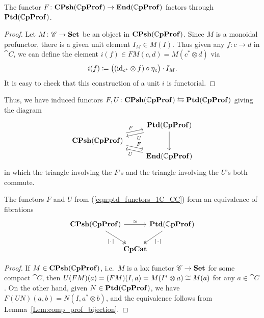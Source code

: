 \documentclass[11pt,oneside,article]{memoir}
\begin{document}
\begin{proposition}
    \label{Prop:canonical unit}
  The functor $F\colon\mathbf{CPsh}(\mathbb{C}\mathbf{pProf})\to\mathbf{End}(\mathbb{C}\mathbf{pProf})$ factors through $\mathbf{Ptd}(\mathbb{C}\mathbf{pProf})$.
\end{proposition}
\begin{proof}
  Let $M\colon \mathscr{C}\to\mathbf{Set}$ be an object in $\mathbf{CPsh}(\mathbb{C}\mathbf{pProf})$. Since $M$ is a monoidal
  profunctor, there is a given unit element $I_M\in M(I)$. Thus given any $f\colon c\to d$ in $
  \cat{C}$, we can define the element $i(f)\in FM(c,d)=M(c^*\otimes d)$ via
  \[
    i(f)\coloneqq\big((\mathrm{id}_{c^*}\otimes f)\circ\eta_c\big)\cdot I_M.
  \]
  It is easy to check that this construction of a unit $i$ is functorial.
\end{proof}

Thus, we have induced functors $F,U\colon\mathbf{CPsh}(\mathbb{C}\mathbf{pProf})\leftrightarrows\mathbf{Ptd}(\mathbb{C}\mathbf{pProf})$ giving
the diagram
\begin{equation} \begin{tikzcd}[row sep=tiny]
    \label{eqn:ptd_functors_1C_CC}
  & \Ptd(\dCompProf) \ar[dd] \ar[dl,shift left,"U"] \\
  \CPsh(\dCompProf) \ar[ur,shift left,"F"] \ar[dr,shift left,"F"] & \\
  & \End(\dCompProf) \ar[ul,shift left,"U"]
\end{tikzcd} \end{equation}
in which the triangle involving the $F$'s and the triangle involving the $U$'s both commute.

\begin{proposition}
    \label{Prop:ptd_prof_equivalence}
  The functors $F$ and $U$ from (\ref{eqn:ptd_functors_1C_CC}) form an equivalence of fibrations
  \[ \begin{tikzcd}[column sep=-.5em]
    \CPsh(\dCompProf) \ar[rr,"\equiv"] \ar[dr,two heads,"\MOb"']
      && \Ptd(\dCompProf) \ar[dl,two heads,"\MOb"] \\
    & \CompCat &
  \end{tikzcd} \]
\end{proposition}
\begin{proof}
  If $M\in\mathbf{CPsh}(\mathbb{C}\mathbf{pProf})$, i.e.\ $M$ is a lax functor $\mathscr{C}\to\mathbf{Set}$ for some compact
  $\cat{C}$, then $U(FM)(a)=(FM)(I,a)=M(I^*\otimes a)\cong M(a)$ for any $a\in \cat{C}$. On the
  other hand, given $N\in\mathbf{Ptd}(\mathbb{C}\mathbf{pProf})$, we have $F(UN)(a,b)=N(I,a^*\otimes b)$, and the
  equivalence follows from Lemma~\ref{Lem:comp_prof_bijection}.
\end{proof}
\end{document}
